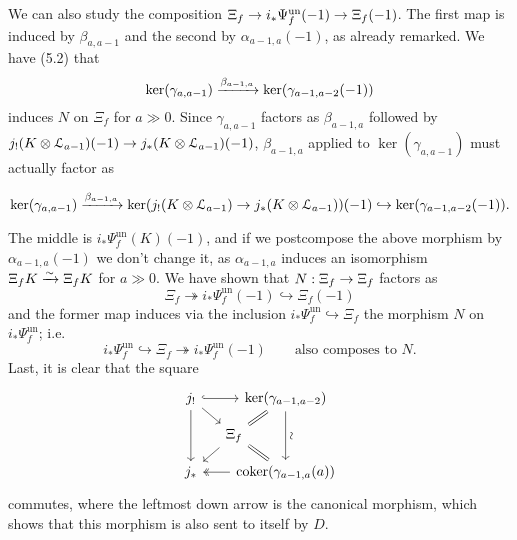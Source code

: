 \documentclass[deligne.tex]{subfiles}
\begin{document}
We can also study the composition
$\Xi_f\rightarrow i_*\Psi_f^{\mathrm{un}}(-1)\rightarrow\Xi_f(-1)$.
The first map is induced by $\beta_{a,a-1}$ and the second by
$\alpha_{a-1,a}(-1)$, as already remarked.
We have (5.2) that
\begin{equation*}
	\ker(\gamma_{a,a-1})\xrightarrow{\beta_{a-1,a}}\ker(\gamma_{a-1,a-2}(-1))
\end{equation*}
induces $N$ on $\Xi_f$ for $a\gg0$. Since $\gamma_{a,a-1}$ factors as
$\beta_{a-1,a}$ followed by
$j_!(K\otimes\mathcal L_{a-1})(-1)\rightarrow j_*(K\otimes\mathcal L_{a-1})(-1)$,
$\beta_{a-1,a}$ applied to $\ker(\gamma_{a,a-1})$ must actually factor as
\begin{ceqn}\begin{equation*}
	\ker(\gamma_{a,a-1})\xrightarrow{\beta_{a-1,a}}
	\ker(j_!(K\otimes\mathcal L_{a-1})\rightarrow j_*(K\otimes\mathcal L_{a-1}))(-1)
	\hookrightarrow
	\ker(\gamma_{a-1,a-2}(-1)).
\end{equation*}\end{ceqn}
The middle is $i_*\Psi_f^{\mathrm{un}}(K)(-1)$, and if we postcompose the
above morphism by $\alpha_{a-1,a}(-1)$ we don't change it, as
$\alpha_{a-1,a}$ induces an isomorphism $\Xi_fK\xrightarrow\sim\Xi_fK$ for $a\gg0$.
We have shown that $N:\Xi_f\rightarrow \Xi_f$ factors as
\begin{equation*}
	\Xi_f\twoheadrightarrow i_*\Psi_f^{\mathrm{un}}(-1)
	\hookrightarrow \Xi_f(-1)
\end{equation*}
and the former map induces via the inclusion
$i_*\Psi_f^{\mathrm{un}}\hookrightarrow\Xi_f$ 
the morphism $N$ on $i_*\Psi_f^{\mathrm{un}}$; i.e.
\begin{equation*}
	i_*\Psi_f^{\mathrm{un}}\hookrightarrow\Xi_f\twoheadrightarrow
	i_*\Psi_f^{\mathrm{un}}(-1)\qquad\text{also composes to $N$.}
\end{equation*}
Last, it is clear that the square
\begin{equation*}\begin{tikzcd}[row sep=small, column sep=small]
	j_!\arrow[rr,hook]\arrow[dr]\arrow[dd]
	&&[-25pt]\ker(\gamma_{a-1,a-2})\arrow[dd,"\rsim"]\arrow[dl,equals] \\
	&\Xi_f\arrow[dr,equals]\arrow[dl] \\
	j_*&&\coker(\gamma_{a-1,a}(a))\arrow[ll,twoheadrightarrow]
\end{tikzcd}\end{equation*}
commutes, where the leftmost down arrow is the canonical morphism, which
shows that this morphism is also sent to itself by $D$.
\end{document}
